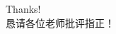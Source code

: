 \begin{frame}[allowframebreaks]
    \nocite{*} %
    
    
\end{frame}

\begin{frame}
    \begin{center}
        {\Huge\calligra Thanks!}
        \\[6ex]
        {\Huge\wuyushengxingkai 恳请各位老师批评指正！}
    \end{center}
\end{frame}
